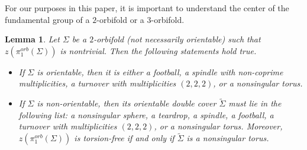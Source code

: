 \documentclass[11pt]{amsart}
\theoremstyle{plain}
\numberwithin{theorem}{section}
\newtheorem{lemma}[theorem]{Lemma}
\theoremstyle{definition}
\begin{document}
For our purposes in this paper, it is important to understand the center of the 
fundamental group of a $2$-orbifold or a $3$-orbifold.

\begin{lemma}
Let $\Sigma$ be a $2$-orbifold (not necessarily orientable) such that $z(\pi_1^{orb}(\Sigma))$
is nontrivial. Then the following statements hold true.
\begin{itemize}
\item [{(a)}] If $\Sigma$ is orientable, then it is either a football, a spindle with non-coprime multiplicities, a turnover with multiplicities $(2,2,2)$, or a nonsingular torus.
\item [{(b)}] If $\Sigma$ is non-orientable, then its orientable double cover $\tilde{\Sigma}$ must lie 
in the following list: a nonsingular sphere, a teardrop, a spindle, a football, a turnover with multiplicities $(2,2,2)$, or a nonsingular torus. Moreover, $z(\pi_1^{orb}(\Sigma))$ is torsion-free 
if and only if $\tilde{\Sigma}$ is a nonsingular torus. 
 \end{itemize}
\end{lemma}
\end{document}
